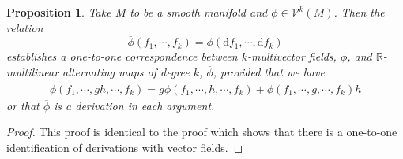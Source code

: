 \documentclass[psamsfonts,12pt]{amsart}
\newcommand\td{\mathrm{d}}
\newcommand\0{\mathbf{0}}
\theoremstyle{plain}
\newtheorem{prop}[thm]{Proposition}
\theoremstyle{definition}
\newcommand{\bbR}{\mathbb{R}}
\newcommand{\sV}{\mathcal{V}}
\begin{document}
\begin{prop}
Take $M$ to be a smooth manifold and $\phi\in\sV^k(M)$.  Then the relation
\[
\overline{\phi}(f_1,\cdots, f_k)= \phi(\td f_1,\cdots, \td f_k)
\]
establishes a one-to-one correspondence between $k$-multivector fields, $\phi$, and $\bbR$-multilinear alternating maps of degree $k$, $\overline{\phi}$, provided that we have 
\begin{align}
\overline{\phi}(f_1,\cdots, gh, \cdots, f_k)=g\overline{\phi}(f_1,\cdots, h,\cdots, f_k)+\overline{\phi}(f_1,\cdots, g,\cdots, f_k)h
\end{align}
or that $\overline{\phi}$ is a derivation in each argument.
\end{prop}
\begin{proof}

This proof is identical to the proof which shows that there is a one-to-one identification of derivations with vector fields.
\end{proof}
\end{document}
